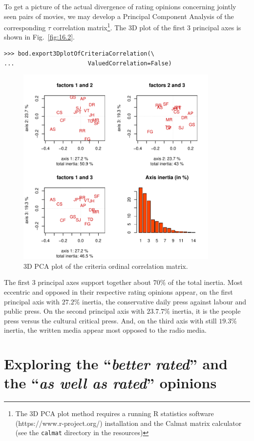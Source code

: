 To get a picture of the actual divergence of rating opinions concerning jointly seen pairs of movies, we may develop a Principal Component Analysis of the corresponding $\tau$ correlation matrix\footnote{The 3D PCA plot method requires a running R statistics software  (https://www.r-project.org/) installation and the Calmat matrix calculator (see the \texttt{calmat} directory in the \Digraph resources)}. The 3D plot of the first 3 principal axes is shown in Fig.~\vref{fig:16.2}.
\begin{lstlisting}
>>> bod.export3DplotOfCriteriaCorrelation(\
...                     ValuedCorrelation=False)
\end{lstlisting}
\begin{figure}[h]
\includegraphics[width=10cm]{Figures/16-4-correlationPCA.pdf}
\caption{3D PCA plot of the criteria ordinal correlation matrix.}
\label{fig:16.4}       %
\end{figure}
The first 3 principal axes support together about $70\%$ of the total inertia. Most eccentric and opposed in their respective rating opinions appear, on the first principal axis with $27.2\%$ inertia, the conservative daily press against labour and public press. On the second principal axis with $23.7.7\%$ inertia, it is the people press versus the cultural critical press. And, on the third axis with still $19.3\%$ inertia, the written media appear most opposed to the radio media.

\section{Exploring the ``\emph{better rated}''  and the ``\emph{as well as rated}'' opinions}
\label{sec:16.5}

